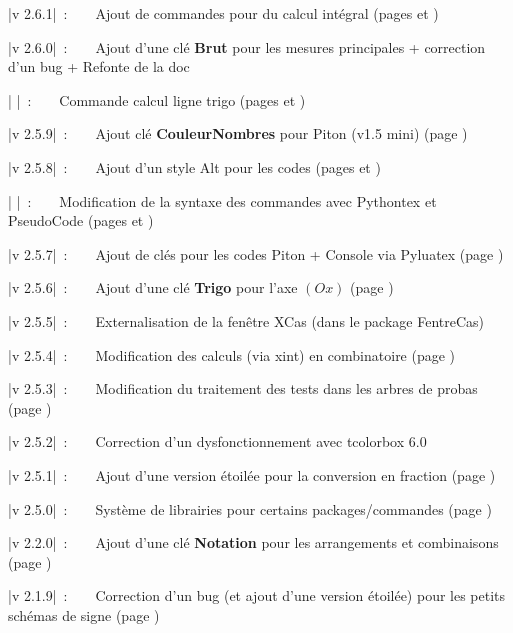 \documentclass[a4paper,french,11pt]{article}
\newcommand\Cle[1]{{\bfseries\sffamily\textlangle \textcolor{orange!75!black}{#1}\textrangle}}
\begin{document}
{{{{{{{{{{{{{{{\small \bverb|v 2.6.1|~:~~~~Ajout de commandes pour du calcul intégral (pages \pageref{calcintegr} et \pageref{integrtikz})

{\small \bverb|v 2.6.0|~:~~~~Ajout d'une clé \Cle{Brut} pour les mesures principales + correction d'un bug} + Refonte de la doc

{\small \bverb|       |~:~~~~Commande calcul ligne trigo (pages \pageref{mesureprincipale} et \pageref{lignestrigo})

{\small \bverb|v 2.5.9|~:~~~~Ajout clé \Cle{CouleurNombres} pour \textsf{Piton} (v1.5 mini) (page \pageref{pythonpiton})

{\small \bverb|v 2.5.8|~:~~~~Ajout d'un style \textsf{Alt} pour les codes (pages \pageref{pythonsimple} et \pageref{pytminted})

{\small \bverb|       |~:~~~~Modification de la syntaxe des commandes avec \textsf{Pythontex} et \textsf{PseudoCode} (pages \pageref{pythontex} et \pageref{pseudocode})

{\small \bverb|v 2.5.7|~:~~~~Ajout de clés pour les codes \textsf{Piton} + Console via \textsf{Pyluatex} (page \pageref{pythonpiton})

{\small \bverb|v 2.5.6|~:~~~~Ajout d'une clé \Cle{Trigo} pour l'axe $(Ox)$ (page \pageref{reperagetikz})

{\small \bverb|v 2.5.5|~:~~~~Externalisation de la fenêtre XCas (dans le package \textsf{FentreCas})

{\small \bverb|v 2.5.4|~:~~~~Modification des calculs (via \textsf{xint}) en combinatoire (page \pageref{combinatoire})

{\small \bverb|v 2.5.3|~:~~~~Modification du traitement des tests dans les arbres de probas (page \pageref{arbresprobas})

{\small \bverb|v 2.5.2|~:~~~~Correction d'un dysfonctionnement avec \textsf{tcolorbox 6.0}

{\small \bverb|v 2.5.1|~:~~~~Ajout d'une version étoilée pour la conversion en fraction (page \pageref{convfrac})

{\small \bverb|v 2.5.0|~:~~~~Système de \textsf{librairies} pour certains packages/commandes (page \pageref{librairies})

{\small \bverb|v 2.2.0|~:~~~~Ajout d'une clé \Cle{Notation} pour les arrangements et combinaisons (page \pageref{combinatoire})

{\small \bverb|v 2.1.9|~:~~~~Correction d'un bug (et ajout d'une version étoilée) pour les petits schémas \og de signe \fg{} (page \pageref{aidesigne})

}}}}}}}}}}}}}}}}}}}}}}}}}}}}}
\end{document}
